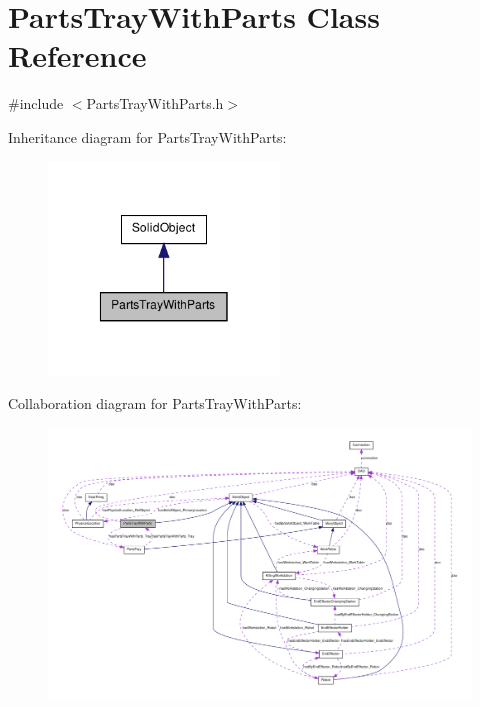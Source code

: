 \hypertarget{class_parts_tray_with_parts}{
\section{PartsTrayWithParts Class Reference}
\label{class_parts_tray_with_parts}
}


{\ttfamily \#include $<$PartsTrayWithParts.h$>$}



Inheritance diagram for PartsTrayWithParts:\nopagebreak
\begin{figure}[H]
\begin{center}
\leavevmode
\includegraphics[width=174pt]{class_parts_tray_with_parts__inherit__graph}
\end{center}
\end{figure}


Collaboration diagram for PartsTrayWithParts:\nopagebreak
\begin{figure}[H]
\begin{center}
\leavevmode
\includegraphics[width=400pt]{class_parts_tray_with_parts__coll__graph}
\end{center}
\end{figure}
